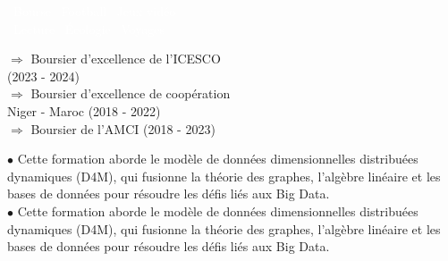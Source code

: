 \documentclass[theme]{cv_einstein}
\begin{document}
\begin{paracol}{2}
\begin{leftcolumn} \noindent \small
    \textcolor{white}{\: \faLineChart\ Bourse }
    \textcolor{white}{\:\faSoccerBallO \ Football} \textcolor{white}{\: \faGamepad\ Jeux vidéo}  \\
    \textcolor{white}{\: \faBook\ Lecture}
    \textcolor{white}{\: \faLeaf\ Écologie}
    \textcolor{white}{\: \faPlane\ Voyages }
\end{leftcolumn}
        \begin{leftcolumn}\noindent \footnotesize
        {\color{white}
\normalsize 
 $\Longrightarrow$ Boursier d'excellence de l'ICESCO \\  (2023 - 2024) \\ [0.5em]
 $\Longrightarrow$  Boursier d'excellence de coopération \\ \;\;\;\; Niger - Maroc  (2018 - 2022) \\ [0.5em]
 $\Longrightarrow$ Boursier de l'AMCI (2018 - 2023)

}
        \end{leftcolumn}
        \begin{rightcolumn}\noindent \small
            \hspace{-2.4pt}
            {$\bullet$ Cette formation aborde le modèle de données dimensionnelles distribuées dynamiques (D4M), qui fusionne la théorie des graphes, l'algèbre linéaire et les\:\:\:\:\:\:\:\:\:\:\:\:\:\:\:\:\:\:\:\:\: bases de données pour résoudre les défis liés aux Big Data.}
             \vspace{0.005cm}\\
            {$\bullet$ Cette formation aborde le modèle de données dimensionnelles distribuées dynamiques (D4M), qui fusionne la théorie des graphes, l'algèbre linéaire et les\:\:\:\:\:\:\:\:\:\:\:\:\:\:\:\:\:\:\:\:\: bases de données pour résoudre les défis liés aux Big Data.}
            \end{rightcolumn}
            \begin{rightcolumn}\noindent \small
        \end{rightcolumn}
        \vspace{0em}
    \end{paracol}
\end{document}
